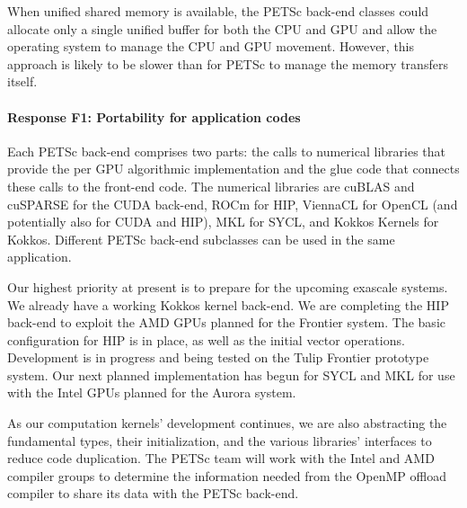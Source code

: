 \documentclass[5p,times]{elsarticle}
\begin{document}
When unified shared memory is available,
the PETSc back-end classes could allocate only a single unified buffer for
both the CPU and GPU and allow the operating system to manage the CPU and GPU movement. However, this approach is likely to be slower than for PETSc to manage
the memory transfers itself.


\paragraph{Response F1: Portability for application codes} 
Each PETSc back-end comprises two parts: the calls to numerical libraries that
provide the per GPU algorithmic implementation and the glue code that connects
these calls to the front-end code. The numerical libraries are cuBLAS and
cuSPARSE for the CUDA back-end, ROCm for HIP,
ViennaCL \cite{VIENNACL} for OpenCL (and potentially also for CUDA and
HIP), MKL for SYCL, and Kokkos Kernels for 
Kokkos. Different PETSc back-end subclasses
can be used in the same application. 
    
Our highest priority at present is to prepare for the upcoming exascale systems.
We already have a working Kokkos kernel back-end. We
are completing the HIP back-end to exploit the AMD GPUs
planned for the Frontier system.   
The basic configuration for HIP is in place, as well as the initial vector
operations. Development is in progress and being tested on the Tulip Frontier prototype
system. Our next planned implementation has begun for SYCL and MKL for use with the Intel GPUs planned for the Aurora system.  

As our computation kernels' development  continues, we are also
abstracting the fundamental types, their initialization, and the various libraries' interfaces to reduce code duplication.
The PETSc team will work with the Intel and AMD compiler groups to determine the information needed from the OpenMP offload compiler to share its data with the PETSc back-end.

\end{document}
